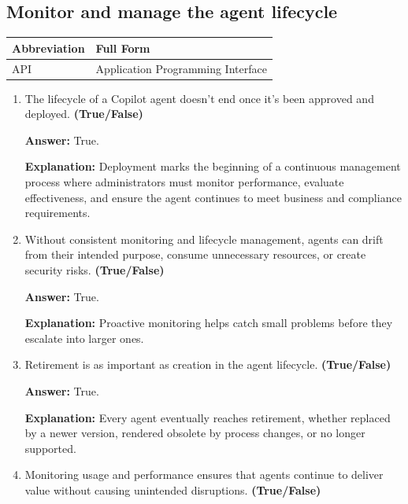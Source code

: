 \documentclass[10pt]{article}
\begin{document}
\clearpage

\subsection{Monitor and manage the agent lifecycle}

\begin{center}
\begin{tabular}{>{\raggedright\arraybackslash}p{} >{\raggedright\arraybackslash}p{}}
\toprule
\textbf{Abbreviation} & \textbf{Full Form} \\
\midrule
API & Application Programming Interface \\
\bottomrule
\end{tabular}
\end{center}

\begin{enumerate}[leftmargin=*]

\item The lifecycle of a Copilot agent doesn’t end once it’s been approved and deployed. \textbf{(True/False)}

\textbf{Answer:} True.

\textbf{Explanation:} Deployment marks the beginning of a continuous management process where administrators must monitor performance, evaluate effectiveness, and ensure the agent continues to meet business and compliance requirements.

\item Without consistent monitoring and lifecycle management, agents can drift from their intended purpose, consume unnecessary resources, or create security risks. \textbf{(True/False)}

\textbf{Answer:} True.

\textbf{Explanation:} Proactive monitoring helps catch small problems before they escalate into larger ones.

\item Retirement is as important as creation in the agent lifecycle. \textbf{(True/False)}

\textbf{Answer:} True.

\textbf{Explanation:} Every agent eventually reaches retirement, whether replaced by a newer version, rendered obsolete by process changes, or no longer supported.

\item Monitoring usage and performance ensures that agents continue to deliver value without causing unintended disruptions. \textbf{(True/False)}


\end{enumerate}
\end{document}
